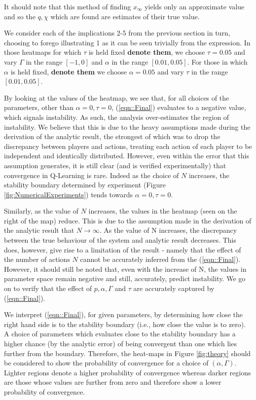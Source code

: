 \documentclass[sigconf]{aamas}
\newcommand{\xfixed}{x_\infty}
\begin{document}
It should note that this method of finding $\xfixed$ yields only an approximate value and so the $q, \chi$ which are found are estimates of their true value. 

We consider each of the implications 2-5 from the previous section in turn, choosing to forego illustrating 1 as it can be seen trivially from the expression. In those heatmaps for which $\tau$ is held fixed \textbf{denote them}, we choose $\tau = 0.05 $ and vary $\Gamma$ in the range $[-1, 0]$ and $\alpha$ in the range $[0.01, 0.05]$. For those in which $\alpha$ is held fixed, \textbf{denote them} we choose $\alpha =  0.05$ and vary $\tau$ in the range $[0.01, 0.05]$.

By looking at the values of the heatmap, we see that, for all choices of the parameters, other than $\alpha = 0, \tau = 0$, (\ref{eqn::Final}) evaluates to a negative value, which signals instability. As such, the analysis over-estimates the region of instability. We believe that this is due to the heavy assumptions made during the derivation of the analytic result, the strongest of which was to drop the discrepancy between players and actions, treating each action of each player to be independent and identically distributed. However, even within the error that this assumption generates, it is still clear (and is verified experimentally) that convergence in Q-Learning is rare. Indeed as the choice of $N$ increases, the stability boundary determined by experiment (Figure \ref{fig:NumericalExperiments}) tends towards $\alpha = 0, \tau = 0$. 

Similarly, as the value of $N$ increases, the values in the heatmap (seen on the right of the map) reduce. This is due to the assumption made in the derivation of the analytic result that $N \rightarrow \infty$. As the value of N increases, the discrepancy between the true behaviour of the system and analytic result decreases. This does, however, give rise to a limitation of the result - namely that the effect of the number of actions $N$ cannot be accurately inferred from the (\ref{eqn::Final}). However, it should still be noted that, even with the increase of N, the values in parameter space remain negative and still, accurately, predict instability. We go on to verify that the effect of $p, \alpha, \Gamma$ and $\tau$ are accurately captured by (\ref{eqn::Final}).

We interpret (\ref{eqn::Final}), for given parameters, by determining how close the right hand side is to the stability boundary (i.e., how close the value is to zero). A choice of parameters which evaluates close to the stability boundary has a higher chance (by the analytic error) of being convergent than one which lies further from the boundary. Therefore, the heat-maps in Figure \ref{fig:theory} should be considered to show the probability of convergence for a choice of $(\alpha, \Gamma)$. Lighter regions denote a higher probability of convergence whereas darker regions are those whose values are further from zero and therefore show a lower probability of convergence.
\end{document}
